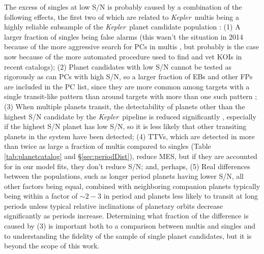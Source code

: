 \documentclass{aastex62}
\newcommand{\ik}{{\it Kepler~}}
\begin{document}
The excess of singles at low S/N is probably caused by a combination of the following effects, {the first two of which are related to \ik multis being a highly reliable subsample of the \ik planet candidate population \citep{Latham:2011, Lissauer:2011b, Lissauer:2012, Lissauer:2014, Rowe:2014}}: (1) A larger fraction of singles being false alarms (this wasn't the situation in 2014 because of the more aggressive search for PCs in multis \citep{Rowe:2014}, but probably is the case now because of the more automated procedure used to find and vet KOIs in recent catalogs); (2) Planet candidates with low S/N cannot be tested as rigorously as can PCs with high S/N, so a larger fraction of EBs and other FPs are included in the PC list, since they are more common among targets with a single transit-like pattern than around targets with more than one such pattern \citep{Latham:2011, Lissauer:2011b, Lissauer:2012, Lissauer:2014, Rowe:2014}; (3) When multiple planets transit, the detectability of planets other than the highest S/N candidate by the \ik pipeline is reduced significantly \citep{Zink:2019}, especially if the highest S/N planet has low S/N, so it is less likely that other transiting planets in the system have been detected; (4) TTVs, which are detected in more than twice as large a fraction of multis compared to singles (Table \ref{tab:planetcatalog} and \S\ref{sec:periodDist}), reduce MES, but if they are accounted for in our model fits, they don't reduce S/N; and, perhaps, (5) Real differences between the populations, such as longer period planets having lower S/N, all other factors being equal, combined with neighboring companion planets typically being within a factor of $\sim 2 - 3$ in period and planets less likely to transit at long periods unless typical relative inclinations of planetary orbits decrease significantly as periods increase.  Determining what fraction of the difference is caused by (3) is important both to a comparison between multis and singles and to understanding the fidelity of the sample of single planet candidates, but it is beyond the scope of this work. 

\end{document}
